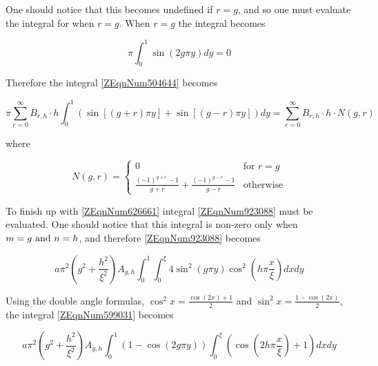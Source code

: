One should notice that this becomes undefined if $r=g$, and so one must evaluate
the integral for when $r=g$. When $r=g$ the integral becomes

\begin{equation*}
    \pi \int _{0}^{1} \sin \left(2g\pi y\right) dy = 0
\end{equation*} 

 Therefore the integral \eqref{ZEqnNum504644} becomes

\begin{equation*}
    \pi \sum _{r=0}^{\infty }B_{r,h} \cdot h\int _{0}^{1} \left(\sin
\left[\left(g+r\right)\pi y\right]+\sin \left[\left(g-r\right)\pi
y\right]\right) dy =\sum _{r=0}^{\infty }B_{r,h} \cdot h\cdot N\left(g,r\right)
\end{equation*}

where

\begin{equation} \label{3.19)} 
    N\left(g,r\right) = \begin{cases}
    0 & \text{for } r = g \\
    \frac{\left(-1\right)^{g + r} - 1}{g + r} + \frac{\left(-1\right)^{g - r} - 1}{g - r} 
    & \text{otherwise}\end{cases} 
\end{equation}

 To finish up with \eqref{ZEqnNum626661} integral \eqref{ZEqnNum923088} must be
 evaluated. One should notice that this integral is non-zero only when $m = g
 \text{ and } n = h$, and therefore \eqref{ZEqnNum923088} becomes

\begin{equation} \label{ZEqnNum599031} 
    a \pi ^{2} \left(g^{2} + \frac{h^{2}}{\xi^{2}} \right)
    A_{g,h} \int _{0}^{1} \int _{0}^{\xi} 4 \sin ^{2} 
    \left(g \pi y\right) \cos ^{2} \left(h \pi \frac{x}{\xi} \right)dxdy 
\end{equation}

Using the double angle formulas, $\cos ^{2} x = \frac{\cos \left(2x\right) + 1}{2} $
and $\sin ^{2} x = \frac{1 - \cos \left(2 x \right)}{2} $, the integral
\eqref{ZEqnNum599031} becomes

\begin{equation} \label{3.21)} 
    a\pi ^{2} \left(g^{2} +\frac{h^{2} }{\xi ^{2} } \right)
    A_{g,h} \int _{0}^{1} \left(1-\cos \left(2g\pi y\right)\right)
    \int_{0}^{\xi } \left(\cos \left(2h \pi \frac{x}{\xi } \right) + 1\right) dxdy
\end{equation}

